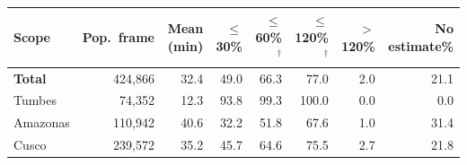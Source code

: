\begin{tabular}{lrrrrrrr}
\toprule
Scope & Pop.\ frame & Mean (min) & $\leq$30\% & $\leq$60\%$^{\dagger}$ & $\leq$120\%$^{\dagger}$ & $>$120\% & No estimate\% \\
\midrule
\bfseries Total & 424,866 & 32.4 & 49.0 & 66.3 & 77.0 & 2.0 & 21.1 \\
Tumbes & 74,352 & 12.3 & 93.8 & 99.3 & 100.0 & 0.0 & 0.0 \\
Amazonas & 110,942 & 40.6 & 32.2 & 51.8 & 67.6 & 1.0 & 31.4 \\
Cusco & 239,572 & 35.2 & 45.7 & 64.6 & 75.5 & 2.7 & 21.8 \\
\bottomrule
\end{tabular}
